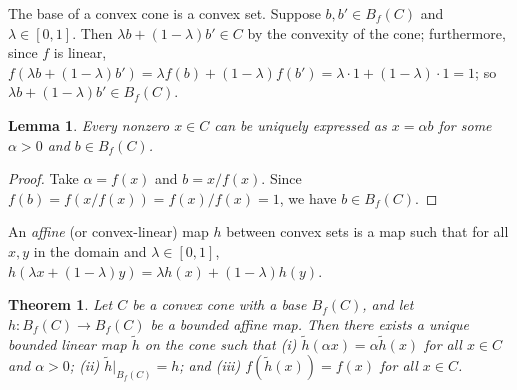 \documentclass[
    11pt,
    letterpaper,
    reprint,
    notitlepage,
    superscriptaddress,
    aps,prx
]{revtex4-2}
\newtheorem{lemma}{Lemma}
\newtheorem{theorem}{Theorem}
\begin{document}
The base of a convex cone is a convex set. Suppose $b,b' \in B_f(C)$ and $\lambda \in [0,1]$. Then $\lambda b + (1-\lambda) b' \in C$ by the convexity of the cone; furthermore, since $f$ is linear, 
$f(\lambda b + (1-\lambda) b') = \lambda f(b) + (1-\lambda) f(b') = \lambda\cdot 1 + (1-\lambda)\cdot 1 = 1$; so $\lambda b + (1-\lambda) b' \in B_f(C)$.

\begin{lemma}\label{lem:UniqueDecomp}
	Every nonzero $x\in C$ can be uniquely expressed as $x = \alpha b$ for some $\alpha > 0$ and $b \in B_f(C)$.
\end{lemma}
\begin{proof}
	Take $\alpha = f(x)$ and $b = x/f(x)$. 
	Since $f(b) = f(x/f(x)) = f(x)/f(x)=1$, we have $b \in B_f(C)$. 
\end{proof}

An \emph{affine} (or convex-linear) map $h$ between convex sets is a map such that for all $x,y$ in the domain and $\lambda \in [0,1]$, 
$h(\lambda x + (1-\lambda) y) = \lambda h(x) + (1-\lambda) h(y)$.

\begin{theorem}\label{thm:ConeExtension}
Let $C$ be a convex cone with a base $B_f(C)$, and let $h: B_f(C) \rightarrow B_f(C)$ be a bounded affine
map. Then there exists a unique bounded linear map $\tilde h$ on the cone such that 
(i) $\tilde h(\alpha x) = \alpha \tilde{h}(x)$ for all $x\in C$ and $\alpha > 0$; 
(ii) $\tilde h\vert_{B_f(C)} = h$; and 
(iii) $f(\tilde h(x)) = f(x)$ for all $x \in C$. 
\end{theorem}
\end{document}
